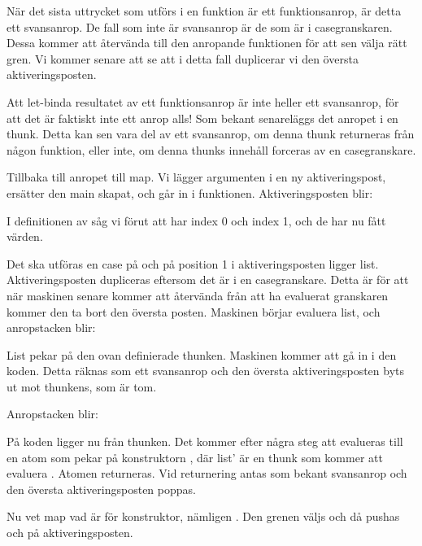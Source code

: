 \documentclass[../Core]{subfiles}
\begin{document}
När det sista uttrycket som utförs i en funktion är ett funktionsanrop, är
detta ett svansanrop. De fall som inte är svansanrop
är de som är i casegranskaren. Dessa kommer att återvända till den anropande
funktionen för att sen välja rätt gren. Vi kommer senare att se att i detta
fall duplicerar vi den översta aktiveringsposten. 

Att let-binda resultatet av ett
funktionsanrop är inte heller ett svansanrop, för att det är faktiskt inte ett
anrop alls! Som bekant senareläggs det anropet i en thunk. Detta kan sen vara
del av ett svansanrop, om denna thunk returneras från någon funktion, eller inte,
om denna thunks innehåll forceras av en casegranskare.

Tillbaka till anropet till map. 
Vi lägger argumenten i en ny aktiveringspost, ersätter den main skapat,
och går in i funktionen. 
Aktiveringsposten blir:
\begin{codeEx}
\end{codeEx}
I definitionen av  såg vi förut att  har index 0 och
 index 1, och de har nu fått värden.

Det ska utföras en case på  och på position 1 i
aktiveringsposten ligger list. Aktiveringsposten dupliceras eftersom
det är i en casegranskare. Detta är för att när maskinen senare kommer
att återvända från att ha evaluerat granskaren kommer den ta bort den 
översta posten. Maskinen börjar evaluera list, och anropstacken blir:
\begin{codeEx}
\end{codeEx}

List pekar på den ovan definierade thunken. Maskinen kommer att gå in i den
koden. Detta räknas som ett svansanrop och den översta aktiveringsposten byts
ut mot thunkens, som är tom.

Anropstacken blir:
\begin{codeEx}
\end{codeEx}

På koden ligger nu  från thunken. 
Det kommer efter några steg att evalueras till en atom 
som pekar på 
konstruktorn , där list' är
en thunk som kommer att evaluera . 
Atomen
returneras. Vid returnering antas som bekant svansanrop och 
den översta aktiveringsposten poppas.


Nu vet map vad  är för konstruktor, nämligen
. Den grenen väljs och då pushas  och 
 på aktiveringsposten. 
\end{document}
